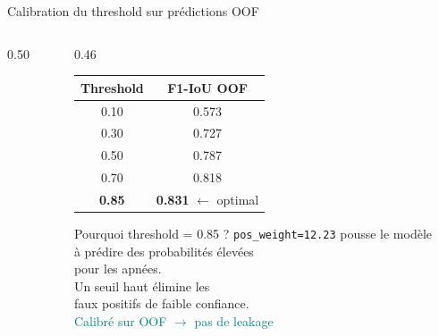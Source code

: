 \documentclass[aspectratio=169, 10pt]{beamer}
\begin{document}
\begin{frame}{Calibration du threshold sur prédictions OOF}
    \begin{columns}[T]
        \begin{column}{0.50\textwidth}
        \end{column}
        \begin{column}{0.46\textwidth}
            \small
            \begin{tabular}{@{}cc@{}}
                \toprule
                \textbf{Threshold} & \textbf{F1-IoU OOF} \\
                \midrule
                0.10 & 0.573 \\
                0.30 & 0.727 \\
                0.50 & 0.787 \\
                0.70 & 0.818 \\
                \textbf{0.85} & \textbf{0.831} $\leftarrow$ optimal \\
                \bottomrule
            \end{tabular}
            \vspace{0.25cm}
            \begin{block}{\small Pourquoi threshold = 0.85 ?}
                \small \texttt{pos\_weight=12.23} pousse le modèle\\
                à prédire des probabilités élevées\\
                pour les apnées.\\[3pt]
                Un seuil haut élimine les\\
                faux positifs de faible confiance.\\[3pt]
                \textcolor{Teal}{Calibré sur OOF $\to$ pas de leakage}
            \end{block}
        \end{column}
    \end{columns}
\end{frame}
\end{document}
